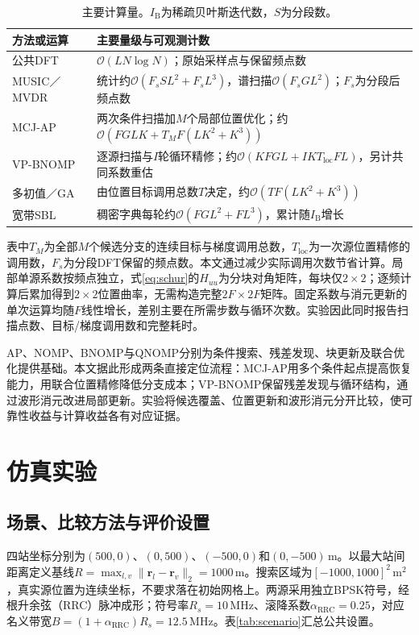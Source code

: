 \documentclass[a4paper,fleqn]{cas-sc}
\numberwithin{equation}{section}
\numberwithin{figure}{section}
\numberwithin{table}{section}
\begin{document}
\begin{table}[pos=htbp]
\centering\small
\caption{主要计算量。$I_{\mathrm B}$为稀疏贝叶斯迭代数，$S$为分段数。}\label{tab:complexity}
\begin{tabularx}{\linewidth}{@{}lX@{}}\toprule
方法或运算 & 主要量级与可观测计数\\\midrule
公共DFT & $\mathcal O(LN\log N)$；原始采样点与保留频点数\\
MUSIC／MVDR & 统计约$\mathcal O(F_sSL^2+F_sL^3)$，谱扫描$\mathcal O(F_sGL^2)$；$F_s$为分段后频点数\\
MCJ-AP & 两次条件扫描加$M$个局部位置优化；约$\mathcal O(FGLK+T_MF(LK^2+K^3))$\\
VP-BNOMP & 逐源扫描与$I$轮循环精修；约$\mathcal O(KFGL+IKT_{\mathrm{loc}}FL)$，另计共同系数重估\\
多初值／GA & 由位置目标调用总数$T$决定，约$\mathcal O(TF(LK^2+K^3))$\\
宽带SBL & 稠密字典每轮约$\mathcal O(FGL^2+FL^3)$，累计随$I_{\mathrm B}$增长\\\bottomrule
\end{tabularx}
\end{table}
表中$T_M$为全部$M$个候选分支的连续目标与梯度调用总数，$T_{\mathrm{loc}}$为一次源位置精修的调用数，$F_s$为分段DFT保留的频点数。本文通过减少实际调用次数节省计算。局部单源系数按频点独立，式\eqref{eq:schur}的$H_{uu}$为分块对角矩阵，每块仅$2\times2$；逐频计算后累加得到$2\times2$位置曲率，无需构造完整$2F\times2F$矩阵。固定系数与消元更新的单次运算均随$F$线性增长，差别主要在所需步数与循环次数。实验因此同时报告扫描点数、目标/梯度调用数和完整耗时。

AP、NOMP、BNOMP与QNOMP分别为条件搜索、残差发现、块更新及联合优化提供基础\cite{ChenHudsonYao2002,Mamandipoor2016,Yang2022,Zeng2025}。本文据此形成两条直接定位流程：MCJ-AP用多个条件起点提高恢复能力，用联合位置精修降低分支成本；VP-BNOMP保留残差发现与循环结构，通过波形消元改进局部更新。实验将候选覆盖、位置更新和波形消元分开比较，使可靠性收益与计算收益各有对应证据。



\section{仿真实验}\label{sec:experiments}
\subsection{场景、比较方法与评价设置}\label{sec:baselines}
四站坐标分别为$(500,0)$、$(0,500)$、$(-500,0)$和$(0,-500)$\,m。以最大站间距离定义基线$R=\max_{l,v}\|\bm r_l-\bm r_v\|_2=1000$\,m。搜索区域为$[-1000,1000]^2$\,m$^2$，真实源位置为连续坐标，不要求落在初始网格上。两源采用独立BPSK符号，经根升余弦（RRC）脉冲成形；符号率$R_s=10$\,MHz、滚降系数$\alpha_{\mathrm{RRC}}=0.25$，对应名义带宽$B=(1+\alpha_{\mathrm{RRC}})R_s=12.5$\,MHz。表\ref{tab:scenario}汇总公共设置。
\end{document}
